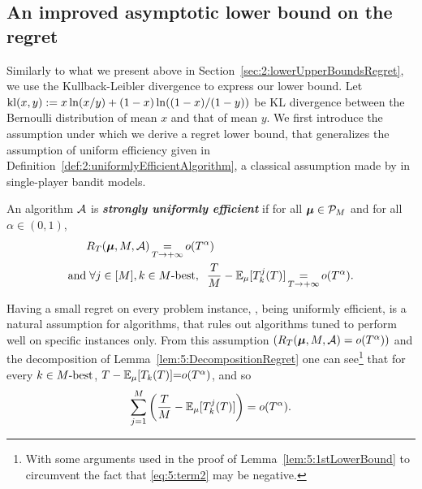 \subsection{An improved asymptotic lower bound on the regret}
\label{sub:5:betterLowerBound}

Similarly to what we present above in Section~\ref{sec:2:lowerUpperBoundsRegret},
we use the Kullback-Leibler divergence to express our lower bound.
Let $\mathrm{kl}(x,y) := x\ln(x/y) + (1-x)\ln((1-x)/(1-y))$ be KL divergence between the Bernoulli distribution of mean $x$ and that of mean $y$.
%
We first introduce the assumption under which we derive a regret lower bound, that generalizes the assumption of uniform efficiency given in Definition~\ref{def:2:uniformlyEfficientAlgorithm},
a classical assumption made by \cite{LaiRobbins85} in single-player bandit models.

\begin{definition}\label{def:5:DecentralizedUniformEfficiency}
\begin{leftbar}[defnbar]  %
  An algorithm $\mathcal{A}$  is \emph{\textbf{strongly uniformly efficient}} if for all $\boldsymbol{\mu} \in \mathcal{P}_M$ and for all $\alpha \in (0,1)$,
  \begin{align}
    & R_T(\boldsymbol{\mu},M,\mathcal{A}) \mathop{=}\limits_{T \to +\infty} o(T^\alpha) \\
    \text{and} & \;
    \forall j \in [M], k \in M\text{-}\mathrm{best}, \;\;
    \frac{T}{M}
    - \mathbb{E}_{\mu}[T^j_k(T)] \mathop{=}\limits_{T \to +\infty} o(T^{\alpha}).
    \label{eq:5:SUE}
  \end{align}
\end{leftbar}  %
\end{definition}


Having a small regret on every problem instance, \ie, being uniformly efficient,
is a natural assumption for algorithms,
that rules out algorithms tuned to perform well on specific instances only.
%
From this assumption $\left(R_T(\boldsymbol{\mu},M,\mathcal{A})=o(T^\alpha)\right)$ and the decomposition of Lemma~\ref{lem:5:DecompositionRegret} one can see\footnote{With some arguments used in the proof of Lemma~\ref{lem:5:1stLowerBound} to circumvent the fact that \ref{eq:5:term2} may be negative.} that for every $k \in M\text{-}\mathrm{best}$,
${T}- \mathbb{E}_{\mu}[T_k(T)] {=} o(T^{\alpha})$, and so
\begin{equation}\label{eq:5:intermediate}
  \sum_{j =1}^M\left(\frac{T}{M} - \mathbb{E}_{\mu}[T^j_k(T)]\right) = o(T^{\alpha}).
\end{equation}

